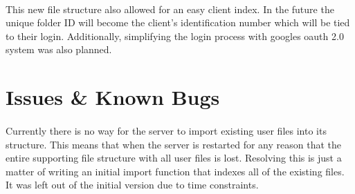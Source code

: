 \paragraph{}
This new file structure also allowed for an easy client index. 
In the future the unique folder ID will become the client's identification number which will be tied to their login. 
Additionally, simplifying the login process with googles oauth 2.0 system was also planned.

\section{Issues \& Known Bugs}
\paragraph{}
Currently there is no way for the server to import existing user files into its structure.
This means that when the server is restarted for any reason that the entire supporting file structure with all user files is lost.
Resolving this is just a matter of writing an initial import function that indexes all of the existing files.
It was left out of the initial version due to time constraints.
